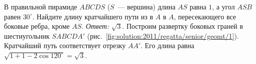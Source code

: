 \problem
В правильной пирамиде $ABCDS$ ($S$~--- вершина) длина $AS$ равна $1$, а угол
$ASB$ равен $30^\circ$.
Найдите длину кратчайшего пути из в $A$ в $A$, пересекающего все боковые ребра,
кроме $AS$.
%
\label{solution:2011/regatta/senior/geomt/1}%
\emph{Ответ:} $\sqrt{3}$.
Построим развертку боковых граней в шестиугольник $SABCDA'$
(рис.~\ref{fig:solution:2011/regatta/senior/geomt/1}).
Кратчайший путь соответствует отрезку $AA'$.
Его длина равна $\sqrt{1 + 1 - 2 \cos 120^\circ} = \sqrt{3}$.
\endproblem
